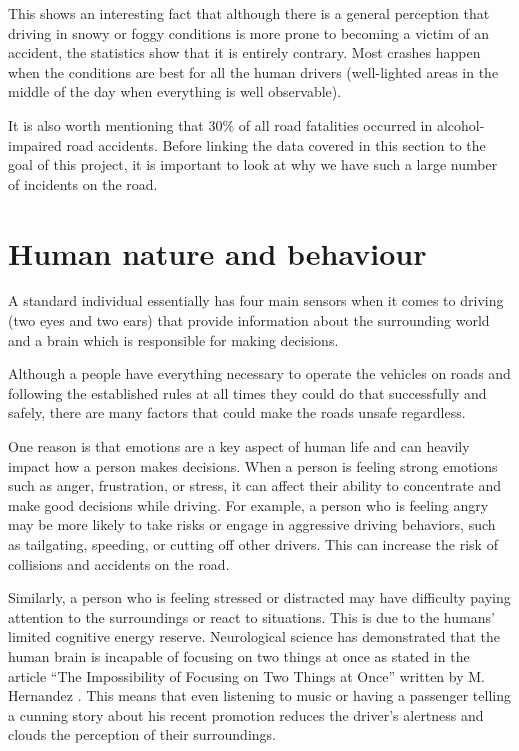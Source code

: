 This shows an interesting fact that although there is a general perception that driving in snowy or foggy conditions is more prone to becoming a victim of an accident, the statistics show that it is entirely contrary. Most crashes happen when the conditions are best for all the human drivers (well-lighted areas in the middle of the day when everything is well observable).

It is also worth mentioning that 30\% of all road fatalities occurred in alcohol-impaired road accidents. Before linking the data covered in this section to the goal of this project, it is important to look at why we have such a large number of incidents on the road.

\section{Human nature and behaviour} \label{sect-3.2}
A standard individual essentially has four main sensors when it comes to driving (two eyes and two ears) that provide information about the surrounding world and a brain which is responsible for making decisions.

Although a people have everything necessary to operate the vehicles on roads and following the established rules at all times they could do that successfully and safely, there are many factors that could make the roads unsafe regardless.

One reason is that emotions are a key aspect of human life and can heavily impact how a person makes decisions. When a person is feeling strong emotions such as anger, frustration, or stress, it can affect their ability to concentrate and make good decisions while driving.
For example, a person who is feeling angry may be more likely to take risks or engage in aggressive driving behaviors, such as tailgating, speeding, or cutting off other drivers. This can increase the risk of collisions and accidents on the road.

Similarly, a person who is feeling stressed or distracted may have difficulty paying attention to the surroundings or react to situations. This is due to the humans' limited cognitive energy reserve. Neurological science has demonstrated that the human brain is incapable of focusing on two things at once as stated in the article ``The Impossibility of Focusing on Two Things at Once'' written by M. Hernandez \cite{focusing_on_things}. This means that even listening to music or having a passenger telling a cunning story about his recent promotion reduces the driver's alertness and clouds the perception of their surroundings.

